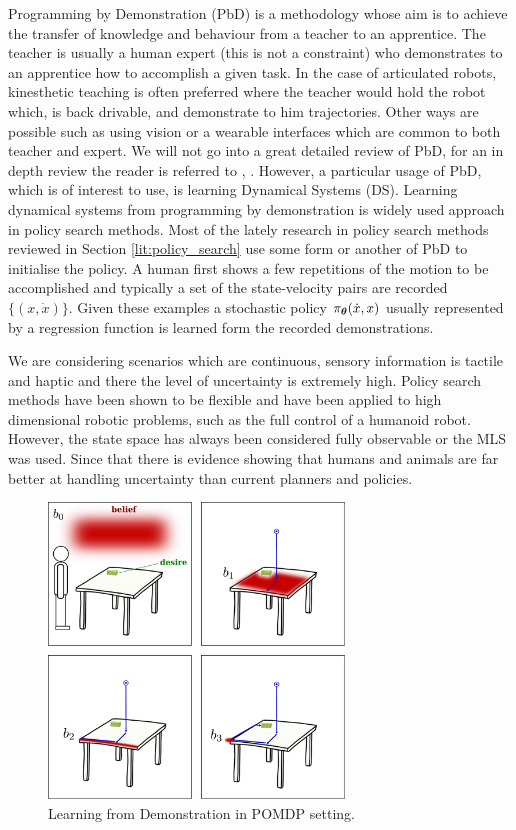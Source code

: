 Programming by Demonstration (PbD) is a methodology whose aim is to achieve the transfer of knowledge and behaviour from a teacher to an apprentice. The teacher 
is usually a human expert (this is not a constraint) who demonstrates to an apprentice how to accomplish a given task. In the case of articulated robots, 
kinesthetic teaching is often preferred where the teacher would hold the robot which, is back drivable, and demonstrate to him trajectories. Other ways are possible
such as using vision or a wearable interfaces which are common to both teacher and expert. We will not go into a great detailed review of PbD, for an in depth review 
the reader is referred to \cite{Billard08chapter}, \cite{Billard_schol_2013}. However, a particular usage of PbD, which is of interest to use, is learning Dynamical Systems (DS).
Learning dynamical systems from programming by demonstration is widely used approach in policy search methods. Most of the lately research in policy search methods reviewed 
in Section \ref{lit:policy_search} use some form or another of PbD to initialise the policy. A human first shows a few repetitions of the 
motion to be accomplished and typically a set of the state-velocity pairs are recorded $\{(x,\dot{x})\}$. Given these examples a stochastic policy $\operatorname{\pi_{\boldsymbol{\theta}}}(\dot{x},x)$ 
usually represented by a regression function is learned form the recorded demonstrations. 

We are considering scenarios which are continuous, sensory information is tactile and haptic and there the level of uncertainty 
is extremely high. Policy search methods have been shown to be flexible and have been applied to high dimensional robotic problems, such as the full control 
of a humanoid robot. However, the state space has always been considered fully observable or the MLS was used. Since that there is evidence 
showing that humans and animals are far better at handling uncertainty than current planners and policies.

\begin{figure}
 \centering
 \includegraphics[width=0.7\textwidth]{./ch2-Background/Figures/reasoning_uncertainty_concept1.pdf}
 \caption{Learning from Demonstration in POMDP setting.}
\end{figure}










